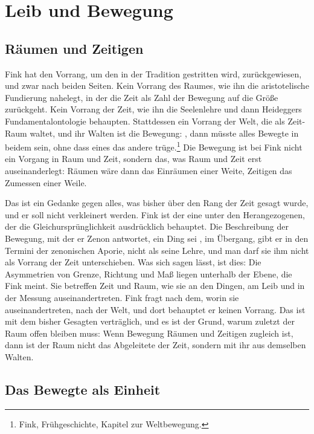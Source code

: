 \chapter{Leib und Bewegung}

\section{Räumen und Zeitigen}

Fink hat den Vorrang, um den in der Tradition gestritten wird, zurückgewiesen, und zwar nach beiden Seiten. Kein Vorrang des Raumes, wie ihn die aristotelische Fundierung nahelegt, in der die Zeit als Zahl der Bewegung auf die Größe zurückgeht. Kein Vorrang der Zeit, wie ihn die Seelenlehre und dann Heideggers Fundamentalontologie behaupten. Stattdessen ein Vorrang der Welt, die als Zeit-Raum waltet, und ihr Walten ist die Bewegung: , dann müsste alles Bewegte in beidem sein, ohne dass eines das andere trüge.\footnote{Fink, Frühgeschichte, Kapitel zur Weltbewegung.} Die Bewegung ist bei Fink nicht ein Vorgang in Raum und Zeit, sondern das, was Raum und Zeit erst auseinanderlegt: Räumen wäre dann das Einräumen einer Weite, Zeitigen das Zumessen einer Weile.

Das ist ein Gedanke gegen alles, was bisher über den Rang der Zeit gesagt wurde, und er soll nicht verkleinert werden. Fink ist der eine unter den Herangezogenen, der die Gleichursprünglichkeit ausdrücklich behauptet. Die Beschreibung der Bewegung, mit der er Zenon antwortet, ein Ding sei , im Übergang, gibt er in den Termini der zenonischen Aporie, nicht als seine Lehre, und man darf sie ihm nicht als Vorrang der Zeit unterschieben. Was sich sagen lässt, ist dies: Die Asymmetrien von Grenze, Richtung und Maß liegen unterhalb der Ebene, die Fink meint. Sie betreffen Zeit und Raum, wie sie an den Dingen, am Leib und in der Messung auseinandertreten. Fink fragt nach dem, worin sie auseinandertreten, nach der Welt, und dort behauptet er keinen Vorrang. Das ist mit dem bisher Gesagten verträglich, und es ist der Grund, warum zuletzt der Raum offen bleiben muss: Wenn Bewegung Räumen und Zeitigen zugleich ist, dann ist der Raum nicht das Abgeleitete der Zeit, sondern mit ihr aus demselben Walten.

\section{Das Bewegte als Einheit}

